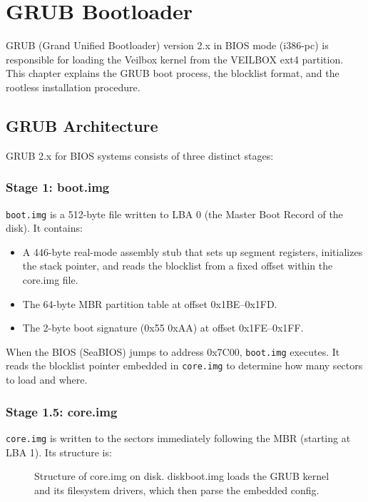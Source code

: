 \chapter{GRUB Bootloader}
\label{ch:grub}

GRUB (Grand Unified Bootloader) version 2.x in BIOS mode (i386-pc) is
responsible for loading the Veilbox kernel from the VEILBOX ext4 partition.
This chapter explains the GRUB boot process, the blocklist format, and
the rootless installation procedure.

\section{GRUB Architecture}

GRUB 2.x for BIOS systems consists of three distinct stages:

\subsection{Stage 1: boot.img}

\texttt{boot.img} is a 512-byte file written to LBA 0 (the Master Boot
Record of the disk). It contains:

\begin{itemize}[nosep]
  \item A 446-byte real-mode assembly stub that sets up segment registers,
        initializes the stack pointer, and reads the blocklist from a fixed
        offset within the core.img file.
  \item The 64-byte MBR partition table at offset 0x1BE–0x1FD.
  \item The 2-byte boot signature (0x55 0xAA) at offset 0x1FE–0x1FF.
\end{itemize}

When the BIOS (SeaBIOS) jumps to address 0x7C00, \texttt{boot.img}
executes. It reads the blocklist pointer embedded in \texttt{core.img}
to determine how many sectors to load and where.

\subsection{Stage 1.5: core.img}

\texttt{core.img} is written to the sectors immediately following the MBR
(starting at LBA 1). Its structure is:

\begin{figure}[H]
\centering
{}
\caption{Structure of core.img on disk. diskboot.img loads the GRUB
kernel and its filesystem drivers, which then parse the embedded config.}
\label{fig:coreimg}
\end{figure}


